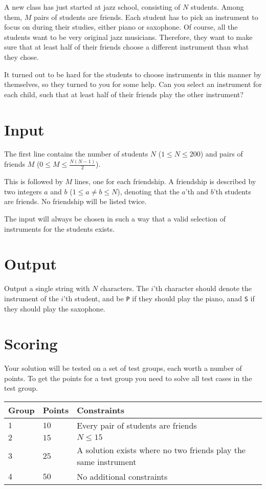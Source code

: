 A new class has just started at jazz school, consisting of $N$ students.
Among them, $M$ pairs of students are friends.
Each student has to pick an instrument to focus on during their studies, either piano or saxophone.
Of course, all the students want to be very original jazz musicians.
Therefore, they want to make sure that at least half of their friends choose a different instrument than what they chose.

It turned out to be hard for the students to choose instruments in this manner by themselves, so they turned to you for some help.
Can you select an instrument for each child, such that at least half of their friends play the other instrument?

\section*{Input}
The first line contains the number of students $N$ ($1 \le N \le 200$) and pairs of friends $M$ ($0 \le M \le \frac{N(N - 1)}{2}$).

This is followed by $M$ lines, one for each friendship.
A friendship is described by two integers $a$ and $b$ ($1 \le a \neq b \le N$), denoting that the $a$'th and $b$'th students are friends.
No friendship will be listed twice.

The input will always be chosen in such a way that a valid selection of instruments for the students exists.

\section*{Output}
Output a single string with $N$ characters.
The $i$'th character should denote the instrument of the $i$'th student, and be \texttt{P} if they should play the piano, anad \texttt{S} if they should play the saxophone.

\section*{Scoring}
Your solution will be tested on a set of test groups, each worth a number of points.
To get the points for a test group you need to solve all test cases in the test group.

\noindent
\begin{tabular}{| l | l | l |}
  \hline
  Group & Points & Constraints \\ \hline
  $1$    & $10$        &  Every pair of students are friends \\ \hline
  $2$    & $15$        &  $N \le 15$ \\ \hline
  $3$    & $25$        &  A solution exists where no two friends play the same instrument \\ \hline
  $4$    & $50$        &  No additional constraints \\ \hline
\end{tabular}

